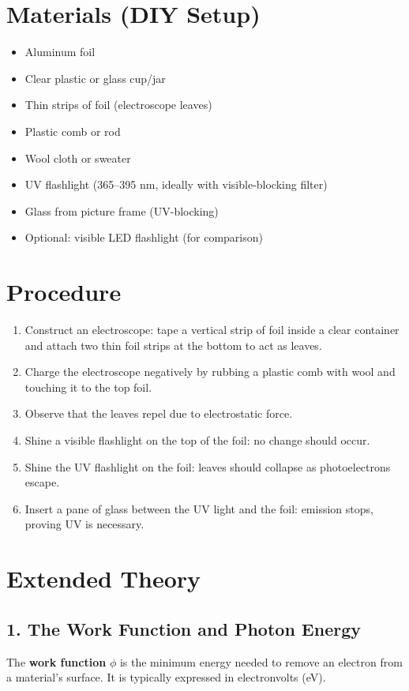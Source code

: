 \documentclass[12pt]{article}
\begin{document}
\section*{Materials (DIY Setup)}
\begin{itemize}
    \item Aluminum foil
    \item Clear plastic or glass cup/jar
    \item Thin strips of foil (electroscope leaves)
    \item Plastic comb or rod
    \item Wool cloth or sweater
    \item UV flashlight (365--395 nm, ideally with visible-blocking filter)
    \item Glass from picture frame (UV-blocking)
    \item Optional: visible LED flashlight (for comparison)
\end{itemize}

\section*{Procedure}
\begin{enumerate}
    \item Construct an electroscope: tape a vertical strip of foil inside a clear container and attach two thin foil strips at the bottom to act as leaves.
    \item Charge the electroscope negatively by rubbing a plastic comb with wool and touching it to the top foil.
    \item Observe that the leaves repel due to electrostatic force.
    \item Shine a visible flashlight on the top of the foil: no change should occur.
    \item Shine the UV flashlight on the foil: leaves should collapse as photoelectrons escape.
    \item Insert a pane of glass between the UV light and the foil: emission stops, proving UV is necessary.
\end{enumerate}

\section*{Extended Theory}

\subsection*{1. The Work Function and Photon Energy}
The \textbf{work function} $\phi$ is the minimum energy needed to remove an electron from a material's surface. It is typically expressed in electronvolts (eV).
\end{document}
